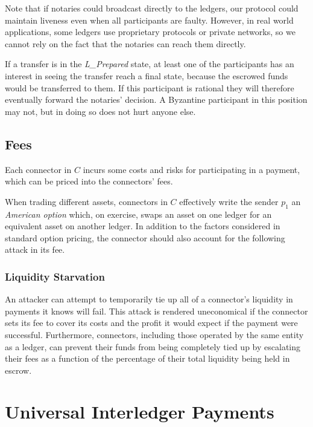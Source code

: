 \documentclass[letterpaper,twocolumn,10pt]{article}
\begin{document}
Note that if notaries could broadcast directly to the ledgers, our protocol could maintain liveness even when all participants are faulty. However, in real world applications, some ledgers use proprietary protocols or private networks, so we cannot rely on the fact that the notaries can reach them directly.

If a transfer is in the \textit{L\_Prepared} state, at least one of the participants has an interest in seeing the transfer reach a final state, because the escrowed funds would be transferred to them. If this participant is rational they will therefore eventually forward the notaries' decision. A Byzantine participant in this position may not, but in doing so does not hurt anyone else.

\subsection{Fees}
\label{subsec:fees}

Each connector in $C$ incurs some costs and risks for participating in a payment, which can be priced into the connectors' fees.

When trading different assets, connectors in $C$ effectively write the sender $p_1$ an \textit{American option} \cite{black1973pricing,brennan1977valuation}
which, on exercise, swaps an asset on one ledger for an equivalent asset on another ledger.
In addition to the factors considered in standard option pricing, the connector should also account for the following attack in its fee.

\subsubsection{Liquidity Starvation}

An attacker can attempt to temporarily tie up all of a connector's liquidity in payments it knows will fail. This attack is rendered uneconomical if the connector sets its fee to cover its costs and the profit it would expect if the payment were successful. Furthermore, connectors, including those operated by the same entity as a ledger, can prevent their funds from being completely tied up by escalating their fees as a function of the percentage of their total liquidity being held in escrow.

\newpage

\section{Universal Interledger Payments}
\label{sec:universal}
\end{document}
